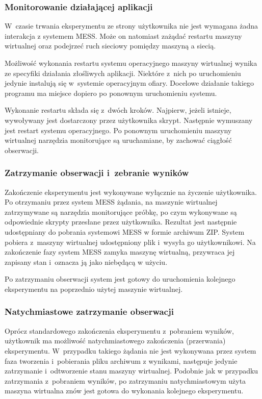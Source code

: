 \documentclass[a4paper,12pt,oneside]{article}
\begin{document}
	\subsubsection{Monitorowanie działającej aplikacji}
	
	W~czasie trwania eksperymentu ze strony użytkownika nie jest wymagana żadna interakcja z systemem MESS.	Może on natomiast zażądać restartu maszyny wirtualnej oraz podejrzeć ruch sieciowy pomiędzy maszyną a siecią. 
	
	Możliwość wykonania restartu systemu operacyjnego maszyny wirtualnej wynika ze specyfiki działania złośliwych aplikacji. Niektóre z~nich po uruchomieniu jedynie instalują się w~systemie operacyjnym ofiary. Docelowe działanie takiego programu ma miejsce dopiero po ponownym uruchomieniu systemu. 
	
	Wykonanie restartu składa się z~dwóch kroków. Najpierw, jeżeli istnieje, wywoływany jest dostarczony przez użytkownika skrypt. Następnie wymuszany jest restart systemu operacyjnego. Po ponownym uruchomieniu maszyny wirtualnej narzędzia monitorujące są uruchamiane, by zachować ciągłość obserwacji. 
		
	\subsubsection{Zatrzymanie obserwacji i~zebranie wyników}
	
	Zakończenie eksperymentu jest wykonywane wyłącznie na życzenie użytkownika. Po  otrzymaniu przez system MESS żądania, na maszynie wirtualnej zatrzymywane są narzędzia monitorujące próbkę, po czym wykonywane są odpowiednie skrypty przesłane przez użytkownika. Rezultat jest następnie udostępniany do pobrania systemowi MESS w formie archiwum ZIP. System pobiera z~maszyny wirtualnej udostępniony plik i~wysyła go użytkownikowi. Na zakończenie fazy system MESS zamyka maszynę wirtualną, przywraca jej zapisany stan i~oznacza ją jako niebędącą w użyciu.
	
	Po zatrzymaniu obserwacji system jest gotowy do uruchomienia kolejnego eksperymentu na poprzednio użytej maszynie wirtualnej.
	
	\subsubsection{Natychmiastowe zatrzymanie obserwacji}
	
	Oprócz standardowego zakończenia eksperymentu z~pobraniem wyników, użytkownik ma możliwość natychmiastowego zakończenia (przerwania) eksperymentu. W~przypadku takiego żądania nie jest wykonywana przez system faza tworzenia i~pobierania pliku archiwum z wynikami, następuje jedynie zatrzymanie i~odtworzenie stanu maszyny wirtualnej. Podobnie jak w przypadku zatrzymania z~pobraniem wyników, po zatrzymaniu natychmiastowym użyta maszyna wirtualna znów jest gotowa do wykonania kolejnego eksperymentu.
	
\end{document}
